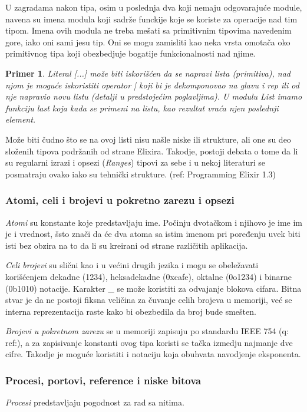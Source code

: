 \documentclass[a4paper]{article}
\newtheorem{primer}{Primer}[section]
\begin{document}
U zagradama nakon tipa, osim u poslednja dva koji nemaju odgovarajuće module, navena su imena modula koji sadrže funckije koje se koriste za operacije nad tim tipom. Imena ovih modula ne treba mešati sa primitivnim tipovima navedenim gore, iako oni sami jesu tip. Oni se mogu zamisliti kao neka vrsta omotača oko primitivnog tipa koji obezbedjuje bogatije funkcionalnosti nad njime. 
\begin{primer}
Literal [...] može biti iskorišćen da se napravi lista (primitiva), nad njom je moguće iskoristiti operator | koji bi je dekomponovao na glavu i rep ili od nje napravio novu listu (detalji u predstojećim poglavljima). U modulu \textit{List} imamo funkciju \textit{last} koja kada se primeni na listu, kao rezultat vraća njen poslednji element.
\end{primer}

Može biti čudno što se na ovoj listi nisu našle niske ili strukture, ali one su deo složenih tipova podržanih od strane Elixira. Takodje, postoji debata o tome da li su regularni izrazi i opsezi (\textit{Ranges}) tipovi za sebe i u nekoj literaturi se posmatraju ovako iako su tehnički strukture. (ref: Programming Elixir 1.3)

\subsubsection{Atomi, celi i brojevi u pokretno zarezu i opsezi}
\label{sec:ime}
\textit{Atomi} su konstante koje predstavljaju ime. Počinju dvotačkom i njihovo je ime im je i vrednost, šsto znači da će dva atoma sa istim imenom pri poređenju uvek biti isti bez obzira na to da li su kreirani od strane različitih aplikacija.

\textit{Celi brojevi} su slični kao i u većini drugih jezika i mogu se obeležavati korišćenjem dekadne (1234), heksadekadne (0xcafe), oktalne (0o1234) i binarne (0b1010) notacije. Karakter \_ se može koristiti za odvajanje blokova cifara. Bitna stvar je da ne postoji fiksna veličina za čuvanje celih brojeva u memoriji, već se interna reprezentacija raste kako bi obezbedila da broj bude smešten.

\textit{Brojevi u pokretnom zarezu} se u memoriji zapisuju po standardu IEEE 754 (q: ref:), a za zapisivanje konstanti ovog tipa koristi se tačka izmedju najmanje dve cifre. Takodje je moguće koristiti i notaciju koja obuhvata navodjenje eksponenta.

\subsubsection{Procesi, portovi, reference i niske bitova}
\label{sec:ime}
\textit{Procesi} predstavljaju pogodnost za rad sa nitima.
\end{document}
